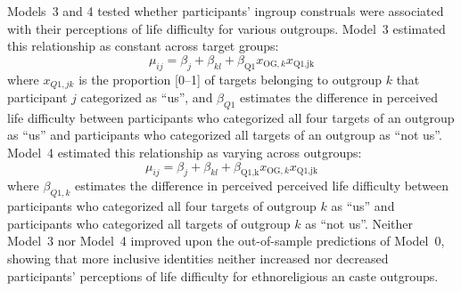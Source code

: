 \documentclass[12pt, a4paper]{article}
\begin{document}
Models~3 and 4 tested whether participants' ingroup construals were associated with their perceptions of life difficulty for various outgroups. Model~3 estimated this relationship as constant across target groups: $$ \mu_{ij} = \beta_{j} + \beta_{kl} + \beta_\text{Q1}x_{\text{OG},k}x_\text{Q1,jk} $$ where $x_{Q1,jk}$ is the proportion [0--1] of targets belonging to outgroup $k$ that participant $j$ categorized as ``us'', and $\beta_{Q1}$ estimates the difference in perceived life difficulty between participants who categorized all four targets of an outgroup as ``us'' and participants who categorized all targets of an outgroup as ``not us''. Model~4 estimated this relationship as varying across outgroups: $$ \mu_{ij} = \beta_{j} + \beta_{kl} + \beta_\text{Q1,k}x_{\text{OG},k}x_\text{Q1,jk} $$ where $\beta_{Q1,k}$ estimates the difference in perceived perceived life difficulty between participants who categorized all four targets of outgroup $k$ as ``us'' and participants who categorized all targets of outgroup $k$ as ``not us''. Neither Model~3 nor Model~4 improved upon the out-of-sample predictions of Model~0, showing that more inclusive identities neither increased nor decreased participants' perceptions of life difficulty for ethnoreligious an caste outgroups. %
\end{document}
